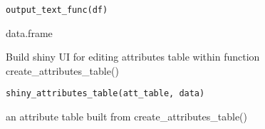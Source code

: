 \documentclass[letterpaper]{book}
\begin{document}
%
\begin{Usage}
\begin{verbatim}
output_text_func(df)
\end{verbatim}
\end{Usage}
%
\begin{Arguments}
\begin{ldescription}
\item[\code{df}] data.frame
\end{ldescription}
\end{Arguments}
%
\begin{Description}\relax
Build shiny UI for editing attributes table within function create\_attributes\_table()
\end{Description}
%
\begin{Usage}
\begin{verbatim}
shiny_attributes_table(att_table, data)
\end{verbatim}
\end{Usage}
%
\begin{Arguments}
\begin{ldescription}
\item[\code{att\_table}] an attribute table built from create\_attributes\_table()
\end{ldescription}
\end{Arguments}
\printindex{}
\end{document}
